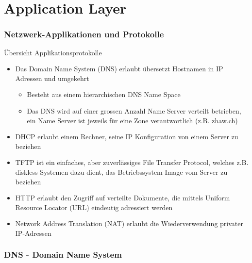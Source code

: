 \section{Application Layer}

\subsubsection{Netzwerk-Applikationen und Protokolle}

\begin{KR}{Übersicht Applikationsprotokolle}
    \begin{itemize}
        \item Das Domain Name System (DNS) erlaubt übersetzt Hostnamen in IP Adressen und umgekehrt
        \begin{itemize}
            \item Besteht aus einem hierarchischen DNS Name Space
            \item Das DNS wird auf einer grossen Anzahl Name Server verteilt betrieben, ein Name Server ist jeweils für eine Zone verantwortlich (z.B. zhaw.ch)
        \end{itemize}
        \item DHCP erlaubt einem Rechner, seine IP Konfiguration von einem Server zu beziehen
        \item TFTP ist ein einfaches, aber zuverlässiges File Transfer Protocol, welches z.B. diskless Systemen dazu dient, das Betriebssystem Image vom Server zu beziehen
        \item HTTP erlaubt den Zugriff auf verteilte Dokumente, die mittels Uniform Resource Locator (URL) eindeutig adressiert werden
        \item Network Address Translation (NAT) erlaubt die Wiederverwendung privater IP-Adressen
    \end{itemize}
\end{KR}

\subsubsection{DNS - Domain Name System}

